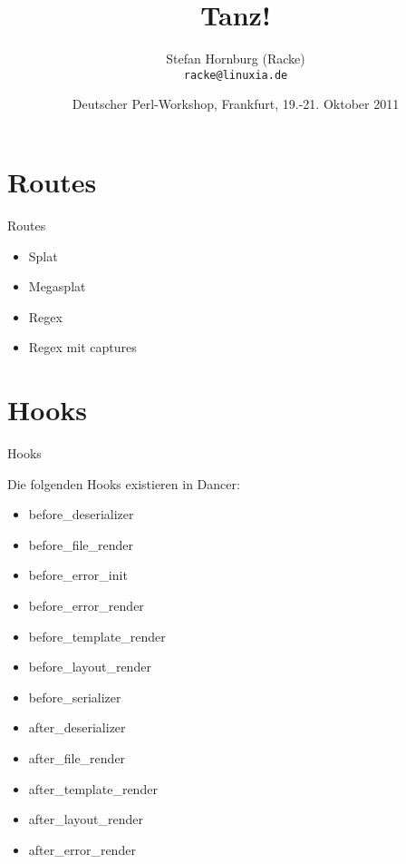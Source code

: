 \usepackage[T1]{fontenc}
\usepackage{mathptmx}
\usepackage[scaled=.90]{helvet}
\usepackage{courier}

\usepackage{beamerthemesplit}
\usepackage{verbatim}
\usepackage{hyperref}
\usepackage{listings}
\lstset{language=Perl,basicstyle=\footnotesize,tabsize=3,showstringspaces=false}

\title{Tanz!}
\author[racke]{Stefan Hornburg (Racke)\\ \texttt{racke@linuxia.de}}
\date[GPW2011]{Deutscher Perl-Workshop, Frankfurt, 19.-21. Oktober 2011}



\maketitle{}

\begin{frame}
  \titlepage
\end{frame}

\tableofcontents

\section{Routes}
\begin{frame}{Routes}
\begin{itemize}
\item Splat
\item Megasplat
\item Regex
\item Regex mit captures
\end{itemize}
\end{frame}

\section{Hooks}
\begin{frame}{Hooks}
\end{frame}

Die folgenden Hooks existieren in Dancer:

\begin{itemize}
\item before\_deserializer
\item before\_file\_render
\item before\_error\_init
\item before\_error\_render
\item before\_template\_render
\item before\_layout\_render
\item before\_serializer
\item after\_deserializer
\item after\_file\_render
\item after\_template\_render
\item after\_layout\_render
\item after\_error\_render
\end{itemize}

